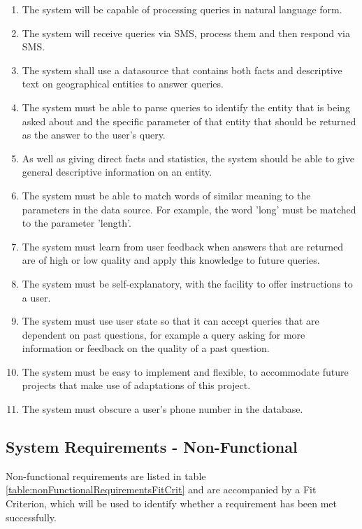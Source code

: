 \documentclass[authoryearcitations]{UoYCSproject}
\begin{document}
\begin{enumerate}
  \item \label{requirement:sysReqNaturalLanguage} The system will be capable of processing queries in natural language form.
  \item The system will receive queries via SMS, process them and then respond via SMS.
  \item The system shall use a datasource that contains both facts and descriptive text on geographical entities to answer queries.
  \item The system must be able to parse queries to identify the entity that is being asked about and the specific parameter of that entity that should be returned as the answer to the user's query.
  \item As well as giving direct facts and statistics, the system should be able to give general descriptive information on an entity.
  \item The system must be able to match words of similar meaning to the parameters in the data source.  For example, the word 'long' must be matched to the parameter 'length'.
  \item The system must learn from user feedback when answers that are returned are of high or low quality and apply this knowledge to future queries.
  \item The system must be self-explanatory, with the facility to offer instructions to a user.
  \item The system must use user state so that it can accept queries that are dependent on past questions, for example a query asking for more information or feedback on the quality of a past question.
  \item \label{requirement:easyToImplement} The system must be easy to implement and flexible, to accommodate future projects that make use of adaptations of this project.
  \item The system must obscure a user's phone number in the database.
\end{enumerate}

\subsection{System Requirements - Non-Functional}
\label{subsubsec:systemRequirementsNonFunctional}
Non-functional requirements are listed in table \ref{table:nonFunctionalRequirementsFitCrit} and are accompanied by a Fit Criterion, which will be used to identify whether a requirement has been met successfully.
\end{document}
